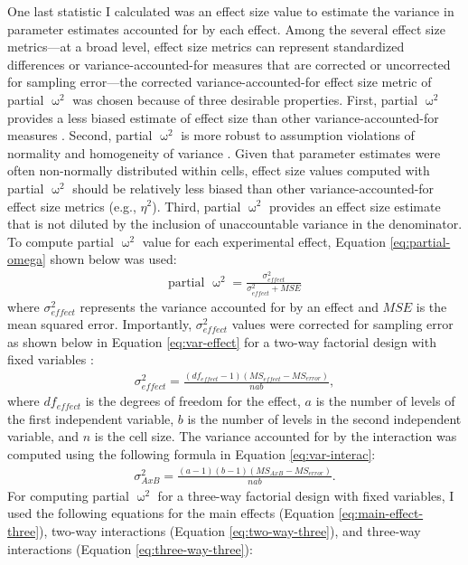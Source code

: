 \documentclass[
12pt, %
twoside,
english]{guelphthesis}
\begin{document}
One last statistic I calculated was an effect size value to estimate the variance in parameter estimates accounted for by each effect. Among the several effect size metrics---at a broad level, effect size metrics can represent standardized differences or variance-accounted-for measures that are corrected or uncorrected for sampling error---the corrected variance-accounted-for effect size metric of partial \(\upomega^2\) was chosen because of three desirable properties. First, partial \(\upomega^2\) provides a less biased estimate of effect size than other variance-accounted-for measures \autocite{okada2013}. Second, partial \(\upomega^2\) is more robust to assumption violations of normality and homogeneity of variance \autocite{yigit2018}. Given that parameter estimates were often non-normally distributed within cells, effect size values computed with partial \(\upomega^2\) should be relatively less biased than other variance-accounted-for effect size metrics (e.g., \(\eta^2\)). Third, partial \(\upomega^2\) provides an effect size estimate that is not diluted by the inclusion of unaccountable variance in the denominator. To compute partial \(\upomega^2\) value for each experimental effect, Equation \ref{eq:partial-omega} shown below was used:
\begin{align}
\text{partial } \upomega^2 = \frac{\sigma^2_{effect}}{\sigma^2_{effect} + MSE} 
\label{eq:partial-omega}
\end{align}
\noindent where \(\sigma^2_{effect}\) represents the variance accounted for by an effect and \(MSE\) is the mean squared error. Importantly, \(\sigma^2_{effect}\) values were corrected for sampling error as shown below in Equation \ref{eq:var-effect} for a two-way factorial design with fixed variables \autocite[Chapter 13]{howell2009}:
\begin{align}
 \sigma^2_{effect} = \frac{(df_{effect} - 1)(MS_{effect} - MS_{error})}{nab},
\label{eq:var-effect}
\end{align}
\noindent where \(df_{effect}\) is the degrees of freedom for the effect, \(a\) is the number of levels of the first independent variable, \(b\) is the number of levels in the second independent variable, and \(n\) is the cell size. The variance accounted for by the interaction was computed using the following formula in Equation \ref{eq:var-interac}:
\begin{align}
 \sigma^2_{A x B} = \frac{(a - 1)(b-1)(MS_{AxB} - MS_{error})}{nab}. 
\label{eq:var-interac}
\end{align}
\noindent For computing partial \(\upomega^2\) for a three-way factorial design with fixed variables, I used the following equations for the main effects (Equation \ref{eq:main-effect-three}), two-way interactions (Equation \ref{eq:two-way-three}), and three-way interactions (Equation \ref{eq:three-way-three}):
\end{document}
